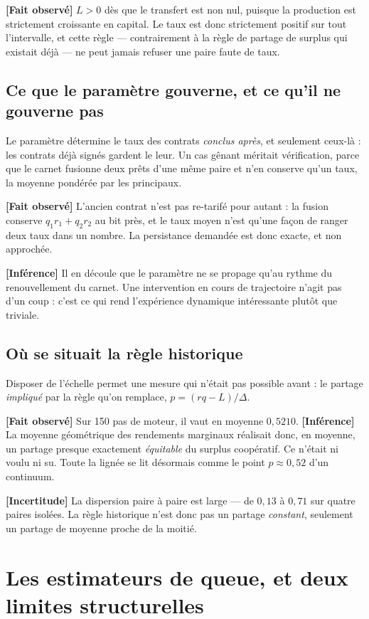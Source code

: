\documentclass[11pt,a4paper]{article}
\newcommand{\fait}{\textbf{[Fait observé]}}
\newcommand{\inference}{\textbf{[Inférence]}}
\newcommand{\incertitude}{\textbf{[Incertitude]}}
\begin{document}
\fait{} $L > 0$ dès que le transfert est non nul, puisque la production est
strictement croissante en capital. Le taux est donc strictement positif sur
tout l'intervalle, et cette règle --- contrairement à la règle de partage de
surplus qui existait déjà --- ne peut jamais refuser une paire faute de taux.

\subsection{Ce que le paramètre gouverne, et ce qu'il ne gouverne pas}

Le paramètre détermine le taux des contrats \emph{conclus après}, et
seulement ceux-là : les contrats déjà signés gardent le leur. Un cas gênant
méritait vérification, parce que le carnet fusionne deux prêts d'une même
paire et n'en conserve qu'un taux, la moyenne pondérée par les principaux.

\fait{} L'ancien contrat n'est pas re-tarifé pour autant : la fusion conserve
$q_1 r_1 + q_2 r_2$ au bit près, et le taux moyen n'est qu'une façon de
ranger deux taux dans un nombre. La persistance demandée est donc exacte, et
non approchée.

\inference{} Il en découle que le paramètre ne se propage qu'au rythme du
renouvellement du carnet. Une intervention en cours de trajectoire n'agit pas
d'un coup : c'est ce qui rend l'expérience dynamique intéressante plutôt que
triviale.

\subsection{Où se situait la règle historique}

Disposer de l'échelle permet une mesure qui n'était pas possible avant : le
partage \emph{impliqué} par la règle qu'on remplace, $p = (r q - L)/\Delta$.

\fait{} Sur 150 pas de moteur, il vaut en moyenne $0{,}5210$. \inference{} La
moyenne géométrique des rendements marginaux réalisait donc, en moyenne, un
partage presque exactement \emph{équitable} du surplus coopératif. Ce n'était
ni voulu ni su. Toute la lignée se lit désormais comme le point
$p \approx 0{,}52$ d'un continuum.

\incertitude{} La dispersion paire à paire est large --- de $0{,}13$ à
$0{,}71$ sur quatre paires isolées. La règle historique n'est donc pas un
partage \emph{constant}, seulement un partage de moyenne proche de la moitié.

\section{Les estimateurs de queue, et deux limites structurelles}
\end{document}
